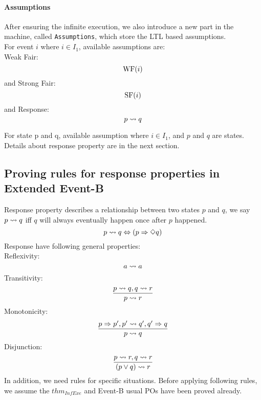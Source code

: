 \paragraph{Assumptions}
After ensuring the infinite execution, we also introduce a new part in the machine, called  \texttt{Assumptions}, which store the LTL based assumptions.\\
For event $i$ where $i\in{I_1}$, available assumptions are:\\
Weak Fair:
\begin{displaymath}
  \mathrm{WF}(i)
\end{displaymath}
and Strong Fair:
\begin{displaymath}
  \mathrm{SF}(i)
\end{displaymath}
and Response:
\begin{displaymath}
  p\rightsquigarrow{q}
\end{displaymath}

For state p and q, available assumption
where $i\in{I_1}$, and $p$ and $q$ are states. Details about response property are in the next section.

\subsection{Proving rules for response properties in Extended Event-B}
Response property describes a relationship between two states $p$ and $q$, we say $p\rightsquigarrow{q}$ iff $q$ will always eventually happen once after $p$ happened. 
\begin{displaymath}
  p\rightsquigarrow{q}\Leftrightarrow({p}\Rightarrow\Diamond{q})
\end{displaymath}
Response have following general properties:\\
Reflexivity:
\begin{displaymath}
  a\rightsquigarrow{a}
\end{displaymath}
Transitivity:
\begin{displaymath}
  \frac{p\rightsquigarrow{q},q\rightsquigarrow{r}}{p\rightsquigarrow{r}}
\end{displaymath}
Monotonicity:
\begin{displaymath}
  \frac{p\Rightarrow{p'},p'\rightsquigarrow{q'},q'\Rightarrow{q}}{p\rightsquigarrow{q}}
\end{displaymath}
Disjunction:
\begin{displaymath}
  \frac{p\rightsquigarrow{r},q\rightsquigarrow{r}}{{(p\vee{q}})\rightsquigarrow{r}}
\end{displaymath}
In addition, we need rules for specific situations. Before applying following rules, we assume the $thm_{InfExe}$ and Event-B usual POs have been proved already.
